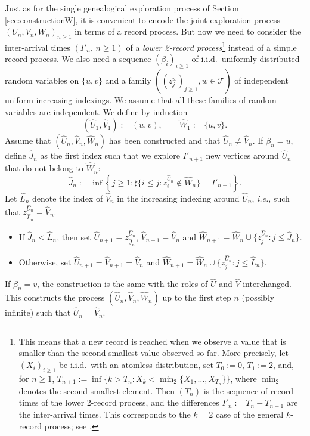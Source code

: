 \documentclass[french]{article}
\newcommand{\zi}{z}
\newcommand{\T}{\mathcal{T}}
\renewcommand{\1}{\mathds{1}}
\begin{document}
Just as for the single genealogical exploration process of Section \ref{sec:constructionW}, it is convenient to encode the joint exploration process $(U_n,V_n,W_n)_{n\ge 1}$ in terms of a record process. But now we need to consider the inter-arrival times $(I'_n,\, n\geq 1)$ of a \emph{lower 2-record process}\footnote{
This means that a new record is reached when we observe a value that is smaller than the second smallest value observed so far. More precisely, let \((X_i)_{i\ge 1}\) be i.i.d.\ with an atomless distribution, set \(T_0:=0\), \(T_1:=2\), and, for \(n\ge 1\), \(T_{n+1}:=\inf\{k> T_n:X_k<\min_2\{X_1,\ldots,X_{T_n}\}\}\), where \(\min_2\) denotes the second smallest element. Then $(T_n)$ is the sequence of record times of the lower 2-record process, and the differences \(I'_n:= T_n- T_{n-1}\) are the inter-arrival times. This corresponds to the \(k=2\) case of the general \(k\)-record process; see \cite{DziubdzielaKopocinski1976,arnold2011}.} instead of a simple record process. We also need a sequence $(\beta_i)_{i\ge 1}$ of i.i.d.\ uniformly distributed random variables on $\{u,v\}$ and a family $((\zi_j^w)_{j \ge 1}, w \in \T)$ of independent uniform increasing indexings. We assume that all these families of random variables are independent.
We define by induction
$$
(\hat{U}_1,\hat{V}_1):=(u,v),
\qquad
\hat{W}_1:=\{u,v\}.
$$
Assume that $(\hat{U}_n,\hat{V}_n, \hat{W}_n)$ has been constructed and that $\hat{U}_n \neq \hat{V}_n$. If $\beta_n=u$, define $\hat{J}_n$ as the first index such that we explore $I'_{n+1}$ new vertices around $\hat{U}_n$ that do not belong to $\hat{W}_n$:
\begin{equation}\label{eq:def1process2record}
\hat{J}_n := \inf\left\{j \ge 1 : \sharp\{i \le j : \zi_i^{\hat{U}_n} \notin \hat{W}_n\}=I'_{n+1}\right\}.
\end{equation}
Let $\hat{L}_n$ denote the index of $\hat{V}_n$ in the increasing indexing around $\hat{U}_n$, \emph{i.e.}, such that $\zi_{\hat{L}_n}^{\hat{U}_n}=\hat{V}_n$. 
\begin{itemize}
    \item If $\hat{J}_n<\hat{L}_n$, then set $\hat{U}_{n+1}=\zi_{\hat{J}_n}^{\hat{U}_{n}}$, $\hat{V}_{n+1}=\hat{V}_n$ and $\hat{W}_{n+1}=\hat{W}_n\cup \{\zi_j^{\hat{U}_{n}}:j\le \hat{J}_n\}$.
    \item Otherwise, set $\hat{U}_{n+1}=\hat{V}_{n+1}=\hat{V}_{n}$ and $\hat{W}_{n+1}=\hat{W}_n\cup \{\zi_j^{\hat{U}_{n}}:j\le \hat{L}_n\}$.
\end{itemize}
If $\beta_n=v$, the construction is the same with the roles of $\hat{U}$ and $\hat{V}$ interchanged.
This constructs the process $(\hat{U}_n,\hat{V}_n,\hat{W}_n)$ up to the first step $n$ (possibly infinite) such that $\hat{U}_n=\hat{V}_n$.
\end{document}
